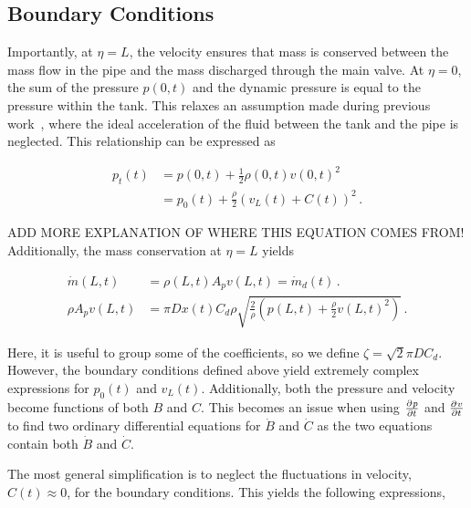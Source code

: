 \subsection{Boundary Conditions}

Importantly, at $\eta = L$, the velocity ensures that mass is conserved between the mass flow in the pipe and the mass discharged through the main valve. At $\eta = 0$, the sum of the pressure $p(0,t)$ and the dynamic pressure is equal to the pressure within the tank. This relaxes an assumption made during previous work~\cite{Hos2015ModelPipe}, where the ideal acceleration of the fluid between the tank and the pipe is neglected. This relationship can be expressed as

\begin{equation*}
\begin{split}
    p_t(t) &= p(0,t) + \frac{1}{2} \rho(0,t) v(0,t)^2 \\
           &= p_0(t) + \frac{\rho}{2} \left( v_L(t) + C(t) \right)^2 \, .
\end{split}
\end{equation*}

ADD MORE EXPLANATION OF WHERE THIS EQUATION COMES FROM! Additionally, the mass conservation at $\eta=L$ yields

\begin{equation*}
\begin{split}
    \dot{m}(L,t) &= \rho(L,t) A_p v(L,t) = \dot{m}_d(t) \, . \\
    \rho A_p v(L,t) &= \pi D x(t) C_d \rho \sqrt{\frac{2}{\rho} \left( p(L,t) + \frac{\rho}{2} v(L,t)^2 \right)} \, .
\end{split}
\end{equation*}

Here, it is useful to group some of the coefficients, so we define $\zeta = \sqrt{2} \pi D C_d$. However, the boundary conditions defined above yield extremely complex expressions for $p_0(t)$ and $v_L(t)$. Additionally, both the pressure and velocity become functions of both $B$ and $C$. This becomes an issue when using $\pdiff{p}{t}$ and $\pdiff{v}{t}$ to find two ordinary differential equations for $\dot{B}$ and $\dot{C}$ as the two equations contain both $\dot{B}$ and $\dot{C}$. 

The most general simplification is to neglect the fluctuations in velocity, $C(t) \approx 0$, for the boundary conditions. This yields the following expressions,


